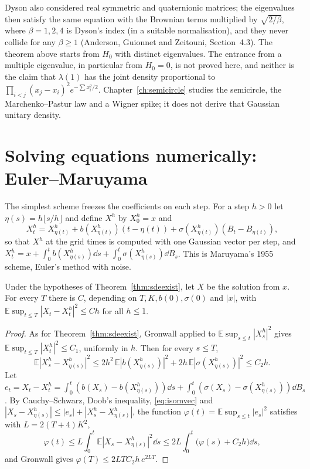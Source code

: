 \begin{remark}
Dyson also considered real symmetric and quaternionic matrices; the eigenvalues then satisfy the same equation with the Brownian terms multiplied by $\sqrt{2/\beta}$, where $\beta=1,2,4$ is Dyson's index (in a suitable normalisation), and
they never collide for any $\beta\ge1$ (Anderson, Guionnet and Zeitouni, Section~4.3). The theorem above starts from $H_0$ with distinct eigenvalues. The entrance from a multiple eigenvalue, in particular from $H_0=0$, is not proved here, and neither is the claim that $\lambda(1)$ has the joint density proportional to
$\prod_{i<j}(x_j-x_i)^2e^{-\sum x_i^2/2}$. Chapter~\ref{ch:semicircle} studies the semicircle, the Marchenko--Pastur law and a Wigner spike; it does not derive that Gaussian unitary density.
\end{remark}

\section{Solving equations numerically: Euler--Maruyama}

The simplest scheme freezes the coefficients on each step. For a step $h>0$ let $\eta(s)=h\lfloor s/h\rfloor$ and define $X^h$ by $X^h_0=x$ and
\[
X^h_t=X^h_{\eta(t)}+b(X^h_{\eta(t)})(t-\eta(t))+\sigma(X^h_{\eta(t)})(B_t-B_{\eta(t)}) ,
\]
so that $X^h$ at the grid times is computed with one Gaussian vector per step, and $X^h_t=x+\int_0^tb(X^h_{\eta(s)})\dd s+\int_0^t\sigma(X^h_{\eta(s)})\dd B_s$. This is Maruyama's 1955 scheme, Euler's method with noise.

\begin{theorem}\label{thm:eulermaruyama}
Under the hypotheses of Theorem~\ref{thm:sdeexist}, let $X$ be the solution from $x$. For every $T$ there is $C$, depending on $T,K,b(0),\sigma(0)$ and $|x|$, with
$\mathbb E\sup_{t\le T}|X_t-X^h_t|^2\le Ch$ for all $h\le1$.
\end{theorem}

\begin{proof}
As for Theorem~\ref{thm:sdeexist}, Gronwall applied to $\mathbb E\sup_{s\le t}|X^h_s|^2$ gives $\mathbb E\sup_{t\le T}|X^h_t|^2\le C_1$, uniformly in $h$. Then for every $s\le T$,
\[
\mathbb E|X^h_s-X^h_{\eta(s)}|^2\le2h^2\,\mathbb E|b(X^h_{\eta(s)})|^2+2h\,\mathbb E|\sigma(X^h_{\eta(s)})|^2\le C_2h.
\]
Let $e_t=X_t-X^h_t=\int_0^t(b(X_s)-b(X^h_{\eta(s)}))\dd s+\int_0^t(\sigma(X_s)-\sigma(X^h_{\eta(s)}))\dd B_s$. By Cauchy--Schwarz, Doob's inequality, \eqref{eq:isomvec} and
$|X_s-X^h_{\eta(s)}|\le|e_s|+|X^h_s-X^h_{\eta(s)}|$, the function $\varphi(t)=\mathbb E\sup_{s\le t}|e_s|^2$ satisfies
with $L=2(T+4)K^2$,
\[
\varphi(t)\le L\int_0^t\mathbb E|X_s-X^h_{\eta(s)}|^2\dd s\le2L\int_0^t\bigl(\varphi(s)+C_2h\bigr)\dd s ,
\]
and Gronwall gives $\varphi(T)\le2LTC_2h\,e^{2LT}$.
\end{proof}

